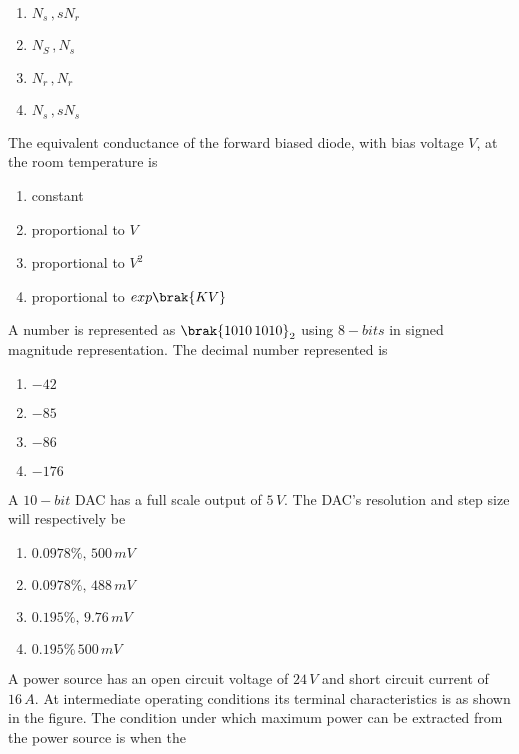         \begin{enumerate}
            \item $N_s\,,sN_r$
            \item $N_S\,, N_s$
            \item $N_r\,, N_r$
            \item $N_s\,, sN_s$
        \end{enumerate}
    \item The equivalent conductance of the forward biased diode, with bias voltage $V$, at the room temperature is
    \begin{enumerate}
        \item constant
        \item proportional to $V$
        \item proportional to $V^2$
        \item proportional to $exp\brak{KV}$
    \end{enumerate}
    \item A number is represented as $\brak{1010\,1010}_2$ using $8-bits$ in signed magnitude representation. The decimal number represented is
    \begin{enumerate}
        \item $-42$
        \item $-85$
        \item $-86$
        \item $-176$
    \end{enumerate}
    \item A $10-bit$ DAC has a full scale output of $5\,V$. The DAC's resolution and step size will respectively be
    \begin{enumerate}
        \item $0.0978\%,\,500\,mV$
        \item $0.0978\%,\,488\,mV$
        \item $0.195\%,\,9.76\,mV$
        \item $0.195\%\,500\,mV$
    \end{enumerate}
    \item A power source has an open circuit voltage of $24\,V$ and short circuit current of $16\,A$. At intermediate operating conditions its terminal characteristics is as shown in the figure. The condition under which maximum power can be extracted from the power source is when the 

